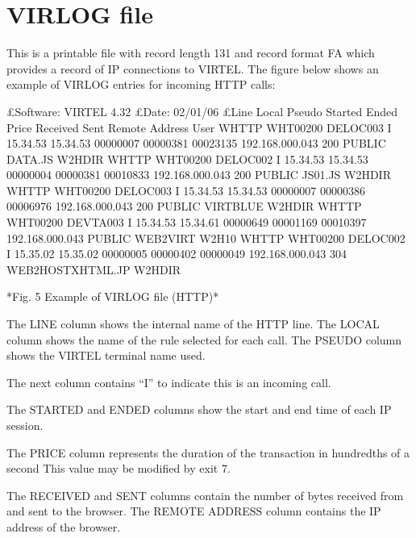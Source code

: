 \documentclass[letterpaper,10pt,english]{sphinxmanual}
\begin{document}

\ignorespaces 

\section{VIRLOG file}
\label{\detokenize{audit_operations_ and_performance:virlog-file}}\label{\detokenize{audit_operations_ and_performance:index-74}}
This is a printable file with record length 131 and record format FA which provides a record of IP connections to VIRTEL. The figure below shows an example of VIRLOG entries for incoming
HTTP calls:

\begin{sphinxVerbatim}[commandchars=\\\{\}]
£Software: VIRTEL 4.32
£Date: 02/01/06
£Line Local Pseudo Started Ended Price Received Sent Remote Address User
W\PYGZhy{}HTTP WHT00200 DELOC003 I 15.34.53 15.34.53 00000007 00000381 00023135 192.168.000.043 200 PUBLIC DATA.JS W2H\PYGZhy{}DIR
W\PYGZhy{}HTTP WHT00200 DELOC002 I 15.34.53 15.34.53 00000004 00000381 00010833 192.168.000.043 200 PUBLIC JS01.JS W2H\PYGZhy{}DIR
W\PYGZhy{}HTTP WHT00200 DELOC003 I 15.34.53 15.34.53 00000007 00000386 00006976 192.168.000.043 200 PUBLIC VIRTBLUE W2H\PYGZhy{}DIR
W\PYGZhy{}HTTP WHT00200 DEVTA003 I 15.34.53 15.34.61 00000649 00001169 00010397 192.168.000.043 PUBLIC WEB2VIRT W2H\PYGZhy{}10
W\PYGZhy{}HTTP WHT00200 DELOC002 I 15.35.02 15.35.02 00000005 00000402 00000049 192.168.000.043 304 WEB2HOSTXHTML.JP W2H\PYGZhy{}DIR

*Fig. 5 Example of VIRLOG file (HTTP)*
\end{sphinxVerbatim}

The LINE column shows the internal name of the HTTP line.
The LOCAL column shows the name of the rule selected for each call.
The PSEUDO column shows the VIRTEL terminal name used.

The next column contains “I” to indicate this is an incoming call.

The STARTED and ENDED columns show the start and end time of each IP session.

The PRICE column represents the duration of the transaction in hundredths of a second This value may be modified by exit 7.

The RECEIVED and SENT columns contain the number of bytes received from and sent to the browser. The REMOTE ADDRESS column contains the IP address of the browser.
\end{document}
